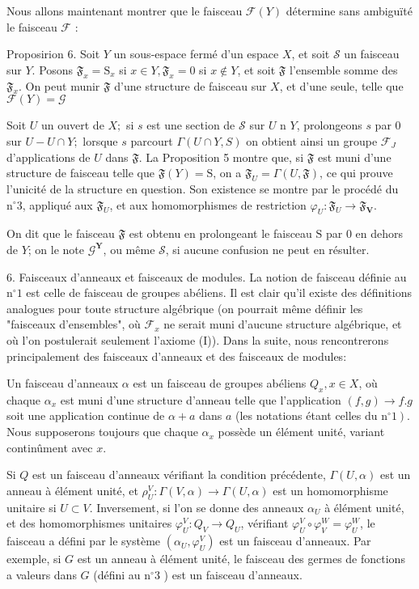 Nous allons maintenant montrer que le faisceau $\mathcal{F}(Y)$ détermine sans ambiguïté le faisceau $\mathcal{F}$ :

Proposirion 6. Soit $Y$ un sous-espace fermé d'un espace $X$, et soit $\mathcal{S}$ un faisceau sur $Y$. Posons $\mathfrak{F}_{x}=\mathrm{S}_{x}$ si $x \in Y, \mathfrak{F}_{x}=0$ si $x \notin Y$, et soit $\mathfrak{F}$ l'ensemble somme des $\mathfrak{F}_{x} .$ On peut munir $\mathfrak{F}$ d'une structure de faisceau sur $X$, et d'une seule, telle que $\mathcal{F}(Y)=\mathcal{G}$

Soit $U$ un ouvert de $X ;$ si $s$ est une section de $\mathcal{S}$ sur $U$ n $Y$, prolongeons $s$ par 0 sur $U-U \cap Y ;$ lorsque $s$ parcourt $\Gamma(U \cap Y, S)$ on obtient ainsi un groupe $\mathcal{F}_{J}$ d'applications de $U$ dans $\mathfrak{F} .$ La Proposition 5 montre que, si $\mathfrak{F}$ est muni d'une structure de faisceau telle que $\mathfrak{F}(Y)=\mathrm{S}$, on a $\mathfrak{F}_{U}=\Gamma(U, \mathfrak{F})$, ce qui prouve l'unicité de la structure en question. Son existence se montre par le procédé du $\mathrm{n}^{\circ} 3$, appliqué aux $\mathfrak{F}_{U}$, et aux homomorphismes de restriction $\varphi_{U}: \mathfrak{F}_{U} \rightarrow \mathfrak{F}_{\boldsymbol{V}}$.

On dit que le faisceau $\mathfrak{F}$ est obtenu en prolongeant le faisceau $\mathrm{S}$ par 0 en dehors de $Y$; on le note $\mathcal{G}^{\boldsymbol{Y}}$, ou même $\mathcal{S}$, si aucune confusion ne peut en résulter.

6. Faisceaux d'anneaux et faisceaux de modules. La notion de faisceau définie au $\mathrm{n}^{\circ} 1$ est celle de faisceau de groupes abéliens. Il est clair qu'il existe des définitions analogues pour toute structure algébrique (on pourrait même définir les "faisceaux d'ensembles", où $\mathscr{F}_{x}$ ne serait muni d'aucune structure algébrique, et où l'on postulerait seulement l'axiome (I)). Dans la suite, nous rencontrerons principalement des faisceaux d'anneaux et des faisceaux de modules:

Un faisceau d'anneaux $\alpha$ est un faisceau de groupes abéliens $Q_{x}, x \in X$, où chaque $\alpha_{x}$ est muni d'une structure d'anneau telle que l'application $(f, g) \rightarrow f . g$ soit une application continue de $\alpha+a$ dans $a$ (les notations étant celles du $\left.\mathrm{n}^{\circ} 1\right)$. Nous supposerons toujours que chaque $\alpha_{x}$ possède un élément unité, variant continûment avec $x$.

Si $Q$ est un faisceau d'anneaux vérifiant la condition précédente, $\Gamma(U, \alpha)$ est un anneau à élément unité, et $\rho_{U}^{V}: \Gamma(V, \alpha) \rightarrow \Gamma(U, \alpha)$ est un homomorphisme unitaire si $U \subset V$. Inversement, si l'on se donne des anneaux $\alpha_{U}$ à élément unité, et des homomorphismes unitaires $\varphi_{U}^{V}: Q_{V} \rightarrow Q_{U}$, vérifiant $\varphi_{U}^{V} \circ \varphi_{V}^{W}=\varphi_{U}^{W}$, le faisceau a défini par le système $\left(\alpha_{U}, \varphi_{U}^{V}\right)$ est un faisceau d'anneaux. Par exemple, si $G$ est un anneau à élément unité, le faisceau des germes de fonctions a valeurs dans $G$ (défini au $\mathrm{n}^{\circ} 3$ ) est un faisceau d'anneaux.

